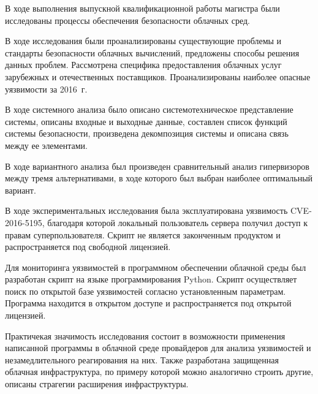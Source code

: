 
В ходе выполнения выпускной квалификационной работы магистра были исследованы процессы обеспечения безопасности облачных сред.

В ходе исследования были проанализированы существующие проблемы и стандарты безопасности облачных вычислений, предложены способы решения данных проблем.
Рассмотрена специфика предоставления облачных услуг зарубежных и отечественных поставщиков.
Проанализированы наиболее опасные уязвимости за 2016~г.

В ходе системного анализа было описано системотехническое представление системы, описаны входные и выходные данные, составлен список функций системы безопасности, произведена декомпозиция системы и описана связь между ее элементами.

В ходе вариантного анализа был произведен сравнительный анализ гипервизоров между тремя альтернативами, в ходе которого был выбран наиболее оптимальный вариант.

В ходе экспериментальных исследования была эксплуатирована уязвимость CVE-2016-5195, благодаря которой локальный пользователь сервера получил доступ к правам суперпользователя.
Скрипт не является законченным продуктом и распространяется под свободной лицензией.

Для мониторинга уязвимостей в программном обеспечении облачной среды был разработан скрипт на языке программирования Python.
Скрипт осуществляет поиск по открытой базе уязвимостей согласно установленным параметрам.
Программа находится в открытом доступе и распространяется под открытой лицензией.

Практичекая значимость исследования состоит в возможности применения написанной программы в облачной среде провайдеров для анализа уязвимостей и незамедлительного реагирования на них.
Также разработана защищенная облачная инфраструктура, по примеру которой можно аналогично строить другие, описаны страгегии расширения инфраструктуры.

\clearpage
